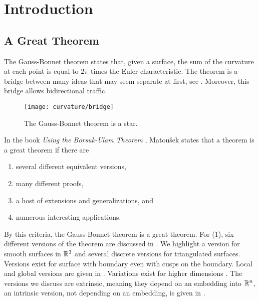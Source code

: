 \section{Introduction}
\label{sec:intro}

\subsection{A Great Theorem}
The Gauss-Bonnet theorem states that, given a surface, the sum of the curvature
at each point is equal to $2\pi$ times the Euler characteristic.
The theorem is a bridge between many ideas that may
seem separate at first, see . 
Moreover, this bridge allows bidirectional traffic.



\begin{figure}[htb]
\centering
\texttt{[image: curvature/bridge]}
\caption{The Gauss-Bonnet theorem is a star.}
\label{fig:bridge}
\end{figure}

In the book \emph{Using the Borsuk-Ulam Theorem}
\cite{jm08},
Matou\v{s}ek states that a theorem is a great theorem if there are
\begin{enumerate}[(1)]
\item several different equivalent versions,
\item many different proofs,
\item a host of extensions and generalizations, and
\item numerous interesting applications.
\end{enumerate}

By this criteria, the Gauss-Bonnet theorem is a great theorem.
For (1), six different versions of the theorem are discussed
in \cite{wu_historical_2008}. 
We highlight a version for smooth surfaces in $\mathbb{R}^3$ and
 several discrete versions for triangulated surfaces. 
 Versions exist for surface with boundary even with cusps on
 the boundary.
 Local and global versions are given in \cite{doc76}.
Variations exist for higher dimensions \cite{guillemin_differential_2010}.
The versions we discuss are extrinsic, meaning they depend on an embedding
into $\mathbb{R}^n$, an intrinsic version, not depending on an embedding,
 is given in \cite{chern_simple_1944}.
 
